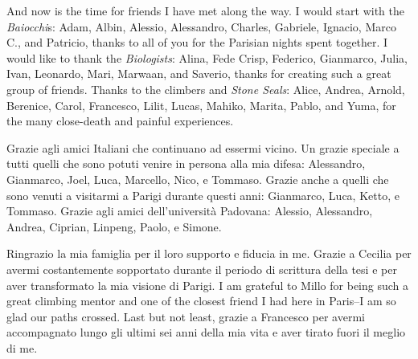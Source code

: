 And now is the time for friends I have met along the way. I would start with the \emph{Baiocchi}s:
Adam,
Albin,
Alessio,
Alessandro,
Charles,
Gabriele,
Ignacio,
Marco C., and
Patricio, thanks to all of you for the Parisian nights spent together.
I would like to thank the \emph{Biologists}:
Alina,
Fede Crisp,
Federico,
Gianmarco,
Julia,
Ivan,
Leonardo,
Mari,
Marwaan,
and Saverio, thanks for creating such a great group of friends.
Thanks to the climbers and \emph{Stone Seals}:
Alice,
Andrea,
Arnold,
Berenice,
Carol,
Francesco,
Lilit,
Lucas,
Mahiko,
Marita,
Pablo,
and Yuma,
for the many close-death and painful experiences.

Grazie agli amici Italiani che continuano ad essermi vicino.
Un grazie speciale a tutti quelli che sono potuti venire in persona alla mia difesa:
Alessandro,
Gianmarco,
Joel,
Luca,
Marcello,
Nico,
e Tommaso.
Grazie anche a quelli che sono venuti a visitarmi a Parigi durante questi anni: Gianmarco, Luca, Ketto, e Tommaso.
Grazie agli amici dell'università Padovana:
Alessio,
Alessandro,
Andrea,
Ciprian,
Linpeng,
Paolo, e
Simone.

Ringrazio la mia famiglia per il loro supporto e fiducia in me. Grazie a Cecilia per avermi costantemente sopportato durante il periodo di scrittura della tesi e per aver transformato la mia visione di Parigi. I am grateful to Millo for being such a great climbing mentor and one of the closest friend I had here in Paris--I am so glad our paths crossed. Last but not least, grazie a Francesco per avermi accompagnato lungo gli ultimi sei anni della mia vita e aver tirato fuori il meglio di me.
